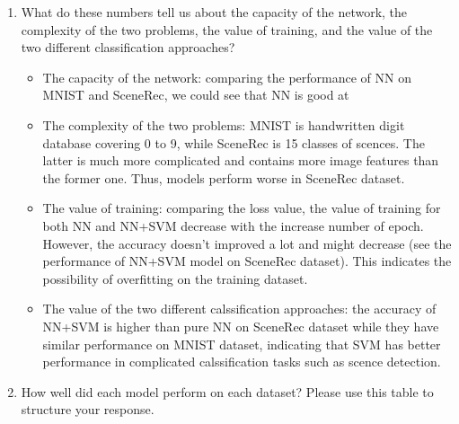 \begin{enumerate}
	\item What do these numbers tell us about the capacity of the network, the complexity of the two problems, the value of training, and the value of the two different classification approaches?

	      \begin{itemize}
		      \item The capacity of the network: comparing the performance of NN on MNIST and SceneRec, we could see that NN is good at
		      \item The complexity of the two problems: MNIST is handwritten digit database covering 0 to 9, while SceneRec is 15 classes of scences. The latter is much more complicated and contains more image features than the former one. Thus, models perform worse in SceneRec dataset.
		      \item The value of training: comparing the loss value, the value of training for both NN and NN+SVM decrease with the increase number of epoch. However, the accuracy doesn't improved a lot and might decrease (see the performance of NN+SVM model on SceneRec dataset). This indicates the possibility of overfitting on the training dataset.
		      \item The value of the two different calssification approaches: the accuracy of NN+SVM is higher than pure NN on SceneRec dataset while they have similar performance on MNIST dataset, indicating that SVM has better performance in complicated calssification tasks such as scence detection.
	      \end{itemize}

	\item How well did each model perform on each dataset? Please use this table to structure your response.


\end{enumerate}
